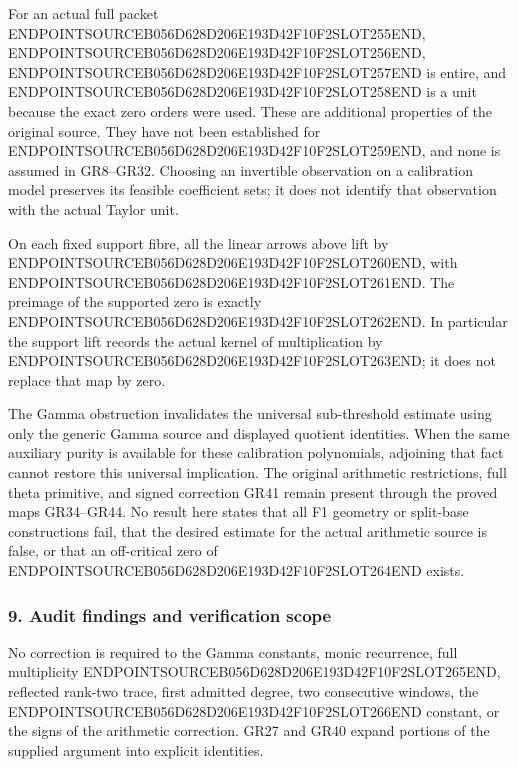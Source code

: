 For an actual full packet ENDPOINTSOURCEB056D628D206E193D42F10F2SLOT255END, ENDPOINTSOURCEB056D628D206E193D42F10F2SLOT256END, ENDPOINTSOURCEB056D628D206E193D42F10F2SLOT257END is entire, and ENDPOINTSOURCEB056D628D206E193D42F10F2SLOT258END is a unit because the exact zero orders were used. These are additional properties of the original source. They have not been established for ENDPOINTSOURCEB056D628D206E193D42F10F2SLOT259END, and none is assumed in GR8--GR32. Choosing an invertible observation on a calibration model preserves its feasible coefficient sets; it does not identify that observation with the actual Taylor unit.

On each fixed support fibre, all the linear arrows above lift by ENDPOINTSOURCEB056D628D206E193D42F10F2SLOT260END, with ENDPOINTSOURCEB056D628D206E193D42F10F2SLOT261END. The preimage of the supported zero is exactly ENDPOINTSOURCEB056D628D206E193D42F10F2SLOT262END. In particular the support lift records the actual kernel of multiplication by ENDPOINTSOURCEB056D628D206E193D42F10F2SLOT263END; it does not replace that map by zero.

The Gamma obstruction invalidates the universal sub-threshold estimate using only the generic Gamma source and displayed quotient identities. When the same auxiliary purity is available for these calibration polynomials, adjoining that fact cannot restore this universal implication. The original arithmetic restrictions, full theta primitive, and signed correction GR41 remain present through the proved maps GR34--GR44. No result here states that all F1 geometry or split-base constructions fail, that the desired estimate for the actual arithmetic source is false, or that an off-critical zero of ENDPOINTSOURCEB056D628D206E193D42F10F2SLOT264END exists.

\subsubsection{9. Audit findings and verification scope}\label{endpoint-gamma_review--audit-findings-and-verification-scope}

No correction is required to the Gamma constants, monic recurrence, full multiplicity ENDPOINTSOURCEB056D628D206E193D42F10F2SLOT265END, reflected rank-two trace, first admitted degree, two consecutive windows, the ENDPOINTSOURCEB056D628D206E193D42F10F2SLOT266END constant, or the signs of the arithmetic correction. GR27 and GR40 expand portions of the supplied argument into explicit identities.

